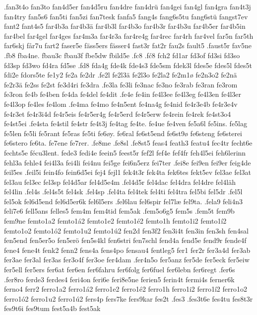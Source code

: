 .fan3t4o
fan3to
fan4d5er
fan4d5ru
fan4dre
fan4drü
fan4gei
fan4gl
fan4gra
fan4t3j
fan4try
fan5s6
fan5ti
fan5zi
fan7tesk
fanfa5
fang4s
fang6s5tu
fang6stü
fangst7ev
fant2
fant4s5
far4b3a
far4b3ä
far4b3l
far4b3o
far4b3r
far4b3u
far4b5er
far4b5in
far4bel
far4gel
far4ges
far4m3a
far4r3a
far4re4g
far4rec
far4rh
far4vel
far5n
far5th
far6skj
får7u
fart2
faser5e
fäss5ers
fässer4
fast3r
fat2r
fau2s
fault5
.faust5r
fav5ne
.fb8
fba4ne.
fbau3c
fbau3f
fbe5dw
fbild5e
.fc8
.fć8
fch2
fd1ar
fd3of
fd3si
fd3so
fd3sp
fd3wo
fd4ra
fd5se
.fd8
fda4g
fde4k
fde4s3
fde5sm
fdek3l
fdes5e
fdes5l
fdes5t
fdi2e
fdors5te
fe1y2
fe2a
fe2dr
.fe2l
fe2l3ä
fe2l3o
fe2la2
fe2m1ø
fe2n3o2
fe2nä
fe2r3ä
fe2ss
fe2st
fe3d4ri
fe3dra
.fe3la
fe3li
fe3nac
fe3no
fe3rab
fe3ran
fe3rom
fe3ron
fe4b
fe4ben
fe4da
fe4del
fe4dit
.fe4e
fe4in
fe4l3ee
fe4l3eg
fe4l3en
fe4l3er
fe4l3op
fe4les
fe4lom
.fe4ma
fe4mo
fe4n5ent
fe4na4g
fe4nid
fe4r3e4b
fe4r3e4v
fe4r3et
fe4r3i4d
fe4r5eis
fe4r5er4g
fe4r5erd
fe4r5erw
fe4rein
fe4rek
fe4st3o4
fe4st5ei
.fe4sta
fe4stil
fe4str
fe4t3j
fe4tag
fe4te.
fe4ue
fe4ven
fe5a6l
fe5ins.
fe5lag
fe5len
fe5li
fe5rant
fe5ras
fe5ti
fe6øy.
fe6ral
fe6st5end
fe6st9ø
fe6steng
fe6sterei
fe6stero
fe6ta.
fe7ene
fe7rer.
.fe8me
.fe8sl
.fe8st5
feas4
feath3
featu4
fec4tr
fecht6e
fechts5e
fécu3lent.
fede3
fedi4e
feein5
feest5r
fef2l
fef4e
fef4fr
feh4l5ei
feh6lerinn
fehl3a
fehle4
fei4l3a
fei4li
fei4nu
fei5ge
fei6n5erz
fei7ter
.fei8e
fei9en
fei9er
feig4de
feil5es
.feil5i
fein4fo
fein6d5ei
fej4
fejl1
fek4t3r
fek4ta
fek6tes
fekt5ev
fel3ae
fel3at
fel3au
fel3ec
fel3sp
fel4d5ar
fel4d5e4m
.fel4d5r
fel4dac
fel4dra
fel4dre
fel4läh
fel4lin
.fel4s
.fel4s5t
fel4sk
.fel4sp
.fel4ta
fel4tek
fel4ti
fel4tra
fel5bi
fel5dr
.fel5l
fel5ok
fel6d5end
fel6d5er6k
fel6l5ers
.fel6lau
fel6spir
fel7læ
fel9ta.
.fela9
feli4n3
feli7e6
fell5ans
felles5
fem4m
fem4tid
fem5ak
.fem5o6g5
fem5s
.fem5t
fem9b
fem9ne
femto1a2
femto1á2
femto1e2
femto1é2
femto1h
femto1i2
femto1í2
femto1o2
femto1ó2
femto1u2
femto1ú2
fen2d
fen3f2
fen3i4t
fen3in
fen3sh
fen4sal
fen5end
fen5er5o
fen5erö
fen5s4kl
fen6stri
fen7schl
fend4a
fend5e
fend9r
fende4f
fene4
fene4t
fenk2
fenn2
fens4a
fens4po
fensau4
fentleg5
fer1
fer2r
fer3a4d
fer3ab
fer3ae
fer3al
fer3as
fer3o4f
fer3oe
fer4dam
.fer4n5o
fer5anz
fer5de
fer5eck
fer5eiw
fer5ell
fer5ers
fer6at
fer6en
fer6fahru
fer6folg
fer6fuel
fer6lebn
fer6regt
.fer6s
.fer8ro
ferde3
ferdes4
feri4on
feri6e
feri8e5ne
ferien5
ferin4t
fermi4s
ferner6k
ferno4
ferr2
ferro1a2
ferro1á2
ferro1e2
ferro1é2
ferro1h
ferro1i2
ferro1í2
ferro1o2
ferro1ó2
ferro1u2
ferro1ú2
fers4p
fers7ke
fers9kar
fes2t
.fes3
.fes3t6e
fes4tu
fes8t3r
fes9t6i
fes9tum
fest5a4b
fest5ak
